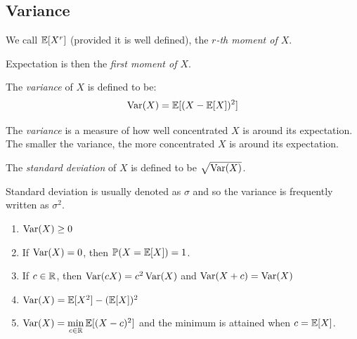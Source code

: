 \documentclass[../main.tex]{subfiles}
\begin{document}
\subsection{Variance}
\begin{definition}[$r$-th moment]
  We call $\mathbb{E}[X^{r}]$ (provided it is well defined), the \textit{$r$-th moment of $X$}.
\end{definition}
\begin{remark}
  Expectation is then the \textit{first moment of $X$}.
\end{remark}
\begin{definition}[Variance]
  The \textit{variance} of $X$ is defined to be:
  \label{varianceDef}
  \[
    \operatorname{Var}(X) = \mathbb{E}[(X - \mathbb{E}[X])^2]
  \]
\end{definition}
\begin{remark}[Intuition]
  The \textit{variance} is a measure of how well concentrated $X$ is around its expectation.
  The smaller the variance, the more concentrated $X$ is around its expectation.
\end{remark}
\begin{definition}
  The \textit{standard deviation} of $X$ is defined to be $\sqrt{\operatorname{Var}(X)}$.

\end{definition}
\begin{remark}[Notation]
  Standard deviation is usually denoted as $\sigma$ and so the variance is frequently written as $\sigma^2$.
\end{remark}
\begin{proposition}
  \begin{enumerate}
    \item $\operatorname{Var}(X) \geq 0$
    \item If $\operatorname{Var}(X) = 0$, then $\mathbb{P}(X = \mathbb{E}[X]) = 1$.
    \item If $c \in \mathbb{R}$, then $\operatorname{Var}(cX) = c^2 \operatorname{Var}(X)$ and $\operatorname{Var}(X + c) = \operatorname{Var}(X)$
    \item $\operatorname{Var}(X) = \mathbb{E}[X^2] - (\mathbb{E}[X])^2$
    \item $\operatorname{Var}(X) = \min\limits_{c \in \mathbb{R}} \mathbb{E}[(X - c)^2]$ and the minimum is attained when $c = \mathbb{E}[X]$.
  \end{enumerate}
\end{proposition}
\end{document}
